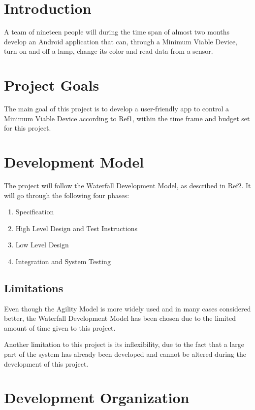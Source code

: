 \documentclass[a4paper]{article}
\begin{document}
\section{Introduction}
A team of nineteen people will during the time span of almost two months develop an Android application that can, through a Minimum Viable Device, turn on and off a lamp, change its color and read data from a sensor.

\section{Project Goals}
The main goal of this project is to develop a user-friendly app to control a Minimum Viable Device according to  Ref1, within the time frame and budget set for this project.

\section{Development Model}
The project will follow the Waterfall Development Model, as described in Ref2. It will go through the following four phases:

\begin{enumerate}
\item Specification
\item High Level Design and Test Instructions
\item Low Level Design
\item Integration and System Testing
\end{enumerate}

\subsection{Limitations}
Even though the Agility Model is more widely used and in many cases considered better, the Waterfall Development Model has been chosen due to the limited amount of time given to this project. 

Another limitation to this project is its inflexibility, due to the fact that a large part of the system has already been developed and cannot be altered during the development of this project.

\section{Development Organization}
\end{document}
